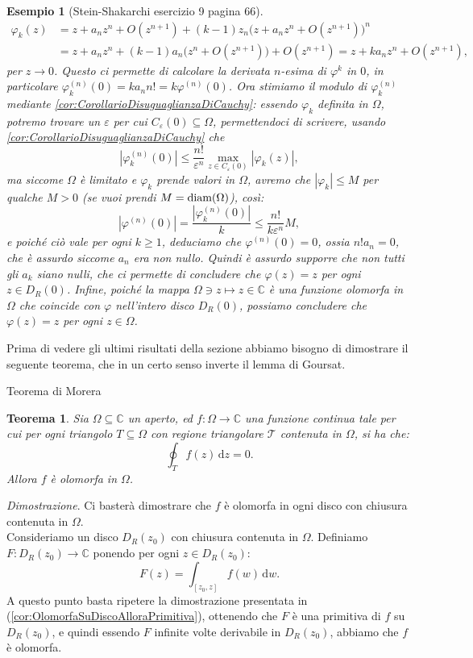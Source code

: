 \documentclass[11pt]{book}
\makeatletter
\theoremstyle{Definizione}
\theoremstyle{TeoremaProposizioneLemmaCorollarioCongettura}
\newtheorem{myteo}{Teorema}[section]
\theoremstyle{OsservazioneNotaEsempio}
\newtheorem{myes}{Esempio}[section]
\renewenvironment{proof}[1][\proofname]{\par
  \normalfont \topsep6\p@\@plus6\p@\relax
  \trivlist
  \item[\hskip\labelsep
        \itshape
    #1\@addpunct{.}]\ignorespaces
}{%
  \endtrivlist\@endpefalse
}
\renewenvironment{proof}{\textsl{Dimostrazione}.}{}
\newcommand{\C}{\mathbb{C}}
\newcommand{\Disc}[3][]{D^{#1}_{{#2}}({#3})}
\renewcommand{\d}{\mathrm{d}}
\newcommand{\dz}{\,\d z}
\newcommand{\dw}{\,\d w}
\makeatother
\begin{document}
\begin{myes}[Stein-Shakarchi esercizio 9 pagina 66]
\begin{align*}
\varphi_k(z) &= z + a_n z^n + O(z^{n+1}) + (k-1)z_n\Big(z+a_nz^n+O(z^{n+1})\Big)^n\\
&= z+a_nz^{n}+(k-1)a_n\big(z^{n}+O(z^{n+1})\big) + O(z^{n+1}) = z+ka_nz^{n}+O(z^{n+1}),
\end{align*}
per $z \to 0$. Questo ci permette di calcolare la derivata $n$-esima di $\varphi^k$ in $0$, in particolare $\varphi_k^{(n)}(0) = k a_n n! = k \varphi^{(n)}(0)$. Ora stimiamo il modulo di $\varphi_k^{(n)}$ mediante \ref{cor:CorollarioDisuguaglianzaDiCauchy}: essendo $\varphi_k$ definita in $\Omega$, potremo trovare un $\varepsilon$ per cui $C_\varepsilon(0)\subseteq \Omega$, permettendoci di scrivere, usando \ref{cor:CorollarioDisuguaglianzaDiCauchy} che
$$
|\varphi_k^{(n)}(0)| \leq \frac{n!}{\varepsilon^n}\max_{z\in C_\varepsilon(0)} |\varphi_k(z)|,
$$
ma siccome $\Omega$ è limitato e $\varphi_k$ prende valori in $\Omega$, avremo che $|\varphi_k| \leq M$ per qualche $M > 0$ (se vuoi prendi $M = \textup{diam}(\Omega)$), così:
$$
|\varphi^{(n)}(0)| = \frac{|\varphi_k^{(n)}(0)|}{k} \leq \frac{n!}{k\varepsilon^n}M,
$$
e poiché ciò vale per ogni $k \geq 1$, deduciamo che $\varphi^{(n)}(0) = 0$, ossia $n! a_n = 0$, che è assurdo siccome $a_n$ era non nullo. Quindi è assurdo supporre che non tutti gli $a_k$ siano nulli, che ci permette di concludere che $\varphi(z) = z$ per ogni $z\in \Disc{R}{0}$. Infine, poiché la mappa $\Omega \ni z \longmapsto z\in \C$ è una funzione olomorfa in $\Omega$ che coincide con $\varphi$ nell'intero disco $\Disc{R}{0}$, possiamo concludere che $\varphi(z) = z$ per ogni $z\in \Omega$.
\end{myes}
Prima di vedere gli ultimi risultati della sezione abbiamo bisogno di dimostrare il seguente teorema, che in un certo senso inverte il lemma di Goursat.
\begin{boxteo}{Teorema di Morera}
\begin{myteo}\label{teo:TeoremaDiMorera}
Sia $\Omega\subseteq \C$ un aperto, ed $f:\Omega\longrightarrow \C$ una funzione continua tale per cui per ogni triangolo $T\subseteq \Omega$ con regione triangolare $\mathscr{T}$ contenuta in $\Omega$, si ha che:
$$
\oint_T f(z)\dz = 0.
$$
Allora $f$ è olomorfa in $\Omega$.
\end{myteo}
\tcblower
\begin{proof}
Ci basterà dimostrare che $f$ è olomorfa in ogni disco con chiusura contenuta in $\Omega$.\\
Consideriamo un disco $\Disc{R}{z_0}$ con chiusura contenuta in $\Omega$. Definiamo $F:\Disc{R}{z_0} \longrightarrow \C$ ponendo per ogni $z\in \Disc{R}{z_0}$:
$$
F(z) = \int_{[z_0,z]} f(w)\dw.
$$
A questo punto basta ripetere la dimostrazione presentata in (\ref{cor:OlomorfaSuDiscoAlloraPrimitiva}), ottenendo che $F$ è una primitiva di $f$ su $\Disc{R}{z_0}$, e quindi essendo $F$ infinite volte derivabile in $\Disc{R}{z_0}$, abbiamo che $f$ è olomorfa.
\end{proof}
\end{boxteo}
\end{document}
